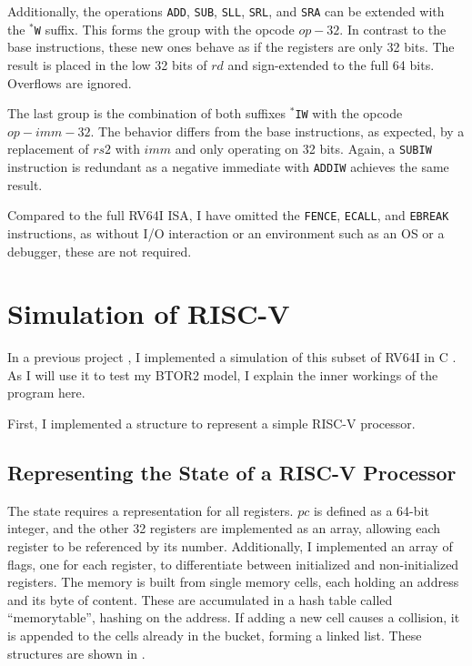 Additionally, the operations \texttt{ADD}, \texttt{SUB},
\texttt{SLL}, \texttt{SRL}, and \texttt{SRA} can be extended with the
\texttt{$^*$W} suffix. This forms the group with the opcode $op-32$.
In contrast to the base instructions, these new ones behave as if the
registers are only 32 bits. The result is placed in the low 32 bits
of $rd$ and sign-extended to the full 64 bits. Overflows are ignored.

The last group is the combination of both suffixes \texttt{$^*$IW}
with the opcode $op-imm-32$. The behavior differs from the base
instructions, as expected, by a replacement of $rs2$ with $imm$ and
only operating on 32 bits. Again, a \texttt{SUBIW} instruction is
redundant as a negative immediate with \texttt{ADDIW} achieves the
same result.

Compared to the full RV64I ISA, I have omitted the \texttt{FENCE},
\texttt{ECALL}, and \texttt{EBREAK} instructions, as without I/O
interaction or an environment such as an OS or a debugger, these are
not required.

\section{Simulation of RISC-V}\label{sec:simulation}
In a previous project , I implemented a
simulation of this subset of RV64I in C \cite{repoSim}. As I will use
it to test my BTOR2 model, I explain the inner workings of the
program here.


First, I implemented a structure to represent a simple RISC-V
processor.

\subsection{Representing the State of a RISC-V Processor}
The state requires a representation for all registers. $pc$ is
defined as a 64-bit integer, and the other 32 registers are
implemented as an array, allowing each register to be referenced by
its number. Additionally, I implemented an array of flags, one for
each register, to differentiate between initialized and
non-initialized registers. The memory is built from single memory
cells, each holding an address and its byte of content. These are
accumulated in a hash table called \enquote{memorytable}, hashing on
the address. If adding a new cell causes a collision, it is appended
to the cells already in the bucket, forming a linked list. These
structures are shown in .

